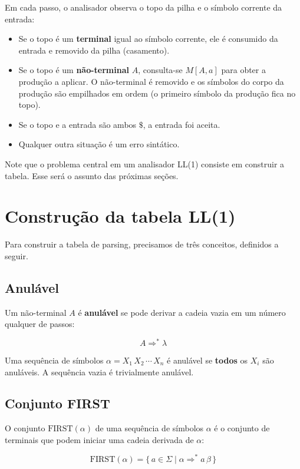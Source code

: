 Em cada passo, o analisador observa o topo da pilha e o símbolo
corrente da entrada:

\begin{itemize}
  \item
    Se o topo é um \textbf{terminal} igual ao símbolo corrente, ele é
    consumido da entrada e removido da pilha (casamento).
  \item
    Se o topo é um \textbf{não-terminal} \(A\), consulta-se \(M[A,
    a]\) para obter a produção a aplicar. O não-terminal é removido e
    os símbolos do corpo da produção são empilhados em ordem (o
    primeiro símbolo da produção fica no topo).
  \item
    Se o topo e a entrada são ambos \(\$\), a entrada foi aceita.
  \item
    Qualquer outra situação é um erro sintático.
\end{itemize}

Note que o problema central em um analisador LL(1) consiste em
construir a tabela. Esse será o assunto das próximas seções.

\section{Construção da tabela LL(1)}

Para construir a tabela de parsing, precisamos de três conceitos,
definidos a seguir.

\subsection{Anulável}

Um não-terminal \(A\) é \textbf{anulável} se pode derivar a cadeia
vazia em um número qualquer de passos:

\[
  A \Rightarrow^* \lambda
\]

Uma sequência de símbolos \(\alpha = X_1\, X_2\, \cdots\, X_n\) é
anulável se \textbf{todos} os \(X_i\) são anuláveis. A sequência
vazia é trivialmente anulável.

\subsection{Conjunto FIRST}

O conjunto \(\mathrm{FIRST}(\alpha)\) de uma sequência de símbolos
\(\alpha\) é o conjunto de terminais que podem iniciar uma cadeia
derivada de \(\alpha\):

\[
  \mathrm{FIRST}(\alpha) = \{\, a \in \Sigma \mid \alpha
  \Rightarrow^* a\,\beta \,\}
\]

